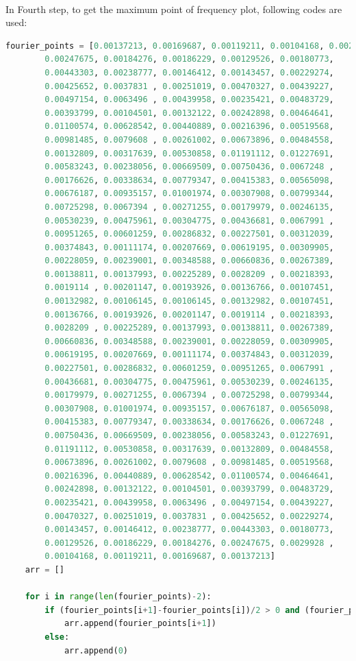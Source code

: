 \documentclass{article}
\begin{document}
\\
In Fourth step, to get the maximum point of frequency plot, following codes are used:
\begin{lstlisting}[language=Python, caption=Fourier data and for loop to get local maximum.]
fourier_points = [0.00137213, 0.00169687, 0.00119211, 0.00104168, 0.0029928 ,
        0.00247675, 0.00184276, 0.00186229, 0.00129526, 0.00180773,
        0.00443303, 0.00238777, 0.00146412, 0.00143457, 0.00229274,
        0.00425652, 0.0037831 , 0.00251019, 0.00470327, 0.00439227,
        0.00497154, 0.0063496 , 0.00439958, 0.00235421, 0.00483729,
        0.00393799, 0.00104501, 0.00132122, 0.00242898, 0.00464641,
        0.01100574, 0.00628542, 0.00440889, 0.00216396, 0.00519568,
        0.00981485, 0.0079608 , 0.00261002, 0.00673896, 0.00484558,
        0.00132809, 0.00317639, 0.00530858, 0.01191112, 0.01227691,
        0.00583243, 0.00238056, 0.00669509, 0.00750436, 0.0067248 ,
        0.00176626, 0.00338634, 0.00779347, 0.00415383, 0.00565098,
        0.00676187, 0.00935157, 0.01001974, 0.00307908, 0.00799344,
        0.00725298, 0.0067394 , 0.00271255, 0.00179979, 0.00246135,
        0.00530239, 0.00475961, 0.00304775, 0.00436681, 0.0067991 ,
        0.00951265, 0.00601259, 0.00286832, 0.00227501, 0.00312039,
        0.00374843, 0.00111174, 0.00207669, 0.00619195, 0.00309905,
        0.00228059, 0.00239001, 0.00348588, 0.00660836, 0.00267389,
        0.00138811, 0.00137993, 0.00225289, 0.0028209 , 0.00218393,
        0.0019114 , 0.00201147, 0.00193926, 0.00136766, 0.00107451,
        0.00132982, 0.00106145, 0.00106145, 0.00132982, 0.00107451,
        0.00136766, 0.00193926, 0.00201147, 0.0019114 , 0.00218393,
        0.0028209 , 0.00225289, 0.00137993, 0.00138811, 0.00267389,
        0.00660836, 0.00348588, 0.00239001, 0.00228059, 0.00309905,
        0.00619195, 0.00207669, 0.00111174, 0.00374843, 0.00312039,
        0.00227501, 0.00286832, 0.00601259, 0.00951265, 0.0067991 ,
        0.00436681, 0.00304775, 0.00475961, 0.00530239, 0.00246135,
        0.00179979, 0.00271255, 0.0067394 , 0.00725298, 0.00799344,
        0.00307908, 0.01001974, 0.00935157, 0.00676187, 0.00565098,
        0.00415383, 0.00779347, 0.00338634, 0.00176626, 0.0067248 ,
        0.00750436, 0.00669509, 0.00238056, 0.00583243, 0.01227691,
        0.01191112, 0.00530858, 0.00317639, 0.00132809, 0.00484558,
        0.00673896, 0.00261002, 0.0079608 , 0.00981485, 0.00519568,
        0.00216396, 0.00440889, 0.00628542, 0.01100574, 0.00464641,
        0.00242898, 0.00132122, 0.00104501, 0.00393799, 0.00483729,
        0.00235421, 0.00439958, 0.0063496 , 0.00497154, 0.00439227,
        0.00470327, 0.00251019, 0.0037831 , 0.00425652, 0.00229274,
        0.00143457, 0.00146412, 0.00238777, 0.00443303, 0.00180773,
        0.00129526, 0.00186229, 0.00184276, 0.00247675, 0.0029928 ,
        0.00104168, 0.00119211, 0.00169687, 0.00137213]
    arr = []

    for i in range(len(fourier_points)-2):
        if (fourier_points[i+1]-fourier_points[i])/2 > 0 and (fourier_points[i+2]-fourier_points[i+1])/2 < 0 :
            arr.append(fourier_points[i+1])
        else:
            arr.append(0)
\end{lstlisting}
\end{document}
